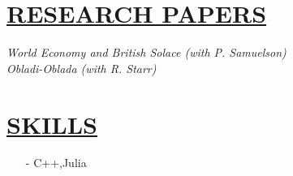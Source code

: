 \documentclass{res} %
\begin{document}
\begin{resume}
\vspace{-.2cm}
\section{\scshape \underline{RESEARCH PAPERS}} 
\vspace{6pt}

\noindent \emph{ World Economy and British Solace (with P. Samuelson)  }\hfill  \\
\noindent \emph{ Obladi-Oblada (with R. Starr)  }\hfill

\vspace{0.15in} 
\section{\scshape \underline{ SKILLS}}
\vspace{6pt} 

\begin{itemize} \itemsep -2pt
  \item[-]  C++,Julia
\end{itemize} \vspace{-6pt}  

\end{resume}
\end{document}
